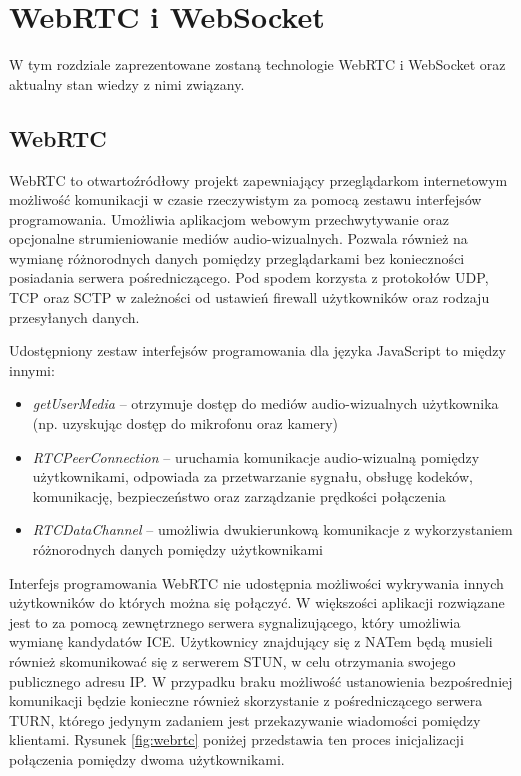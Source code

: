 \documentclass[language=polish,type=master]{aghmodern}
\begin{document}
\chapter{WebRTC i WebSocket}
W tym rozdziale zaprezentowane zostaną technologie WebRTC i WebSocket oraz aktualny stan wiedzy z nimi związany.

\section{WebRTC}
WebRTC to otwartoźródłowy projekt zapewniający przeglądarkom internetowym możliwość komunikacji w czasie rzeczywistym za pomocą zestawu interfejsów programowania.
Umożliwia aplikacjom webowym przechwytywanie oraz opcjonalne strumieniowanie mediów audio-wizualnych.
Pozwala również na wymianę różnorodnych danych pomiędzy przeglądarkami bez konieczności posiadania serwera pośredniczącego.
Pod spodem korzysta z protokołów UDP, TCP oraz SCTP w zależności od ustawień firewall użytkowników oraz rodzaju przesyłanych danych.

Udostępniony zestaw interfejsów programowania dla języka JavaScript to między innymi:

\begin{itemize}
    \item \emph{getUserMedia} -- otrzymuje dostęp do mediów audio-wizualnych użytkownika (np. uzyskując dostęp do mikrofonu oraz kamery)
    \item \emph{RTCPeerConnection} -- uruchamia komunikacje audio-wizualną pomiędzy użytkownikami, odpowiada za przetwarzanie sygnału, obsługę kodeków, komunikację, bezpieczeństwo oraz zarządzanie prędkości połączenia
    \item \emph{RTCDataChannel} -- umożliwia dwukierunkową komunikacje z wykorzystaniem różnorodnych danych pomiędzy użytkownikami
\end{itemize}

Interfejs programowania WebRTC nie udostępnia możliwości wykrywania innych użytkowników do których można się połączyć.
W większości aplikacji rozwiązane jest to za pomocą zewnętrznego serwera sygnalizującego, który umożliwia wymianę kandydatów ICE\footnotemark{}.
Użytkownicy znajdujący się z NATem będą musieli również skomunikować się z serwerem STUN\footnotemark{}, w celu otrzymania swojego publicznego adresu IP.
W przypadku braku możliwość ustanowienia bezpośredniej komunikacji będzie konieczne również skorzystanie z pośredniczącego serwera TURN\footnotemark{}, którego jedynym zadaniem jest przekazywanie wiadomości pomiędzy klientami.
Rysunek \ref{fig:webrtc} poniżej przedstawia ten proces inicjalizacji połączenia pomiędzy dwoma użytkownikami.
\end{document}
